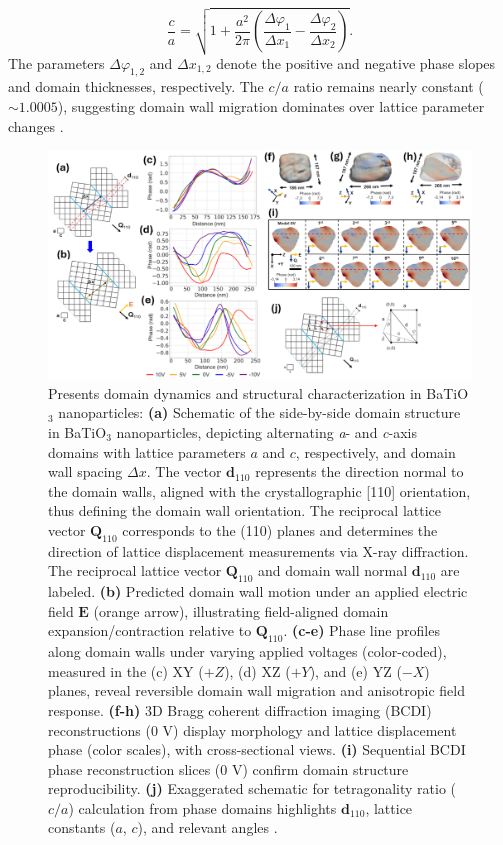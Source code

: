 \documentclass[a4paper,fleqn]{cas-sc}
\begin{document}
\begin{equation} 
\frac{c}{a} = \sqrt{1 + \frac{a^2}{2 \pi} \left( \frac{\Delta \varphi_1}{\Delta x_1} - \frac{\Delta \varphi_2}{\Delta x_2} \right)}.
\end{equation}
The parameters $\Delta\varphi_{1,2}$ and $\Delta x_{1,2}$ denote the positive and negative phase slopes and domain thicknesses, respectively. The $c/a$ ratio remains nearly constant ($\sim\!1.0005$), suggesting domain wall migration dominates over lattice parameter changes \cite{liu2025electric}.
\begin{figure}
\centering
\includegraphics[width=0.95\linewidth]{figures/BCDI_domain_dynamics_multiplane}
\caption{Presents domain dynamics and structural characterization in BaTiO\(_3\) nanoparticles: \textbf{(a)} Schematic of the side-by-side domain structure in BaTiO$_3$ nanoparticles, depicting alternating \textit{a}- and \textit{c}-axis domains with lattice parameters $a$ and $c$, respectively, and domain wall spacing $\Delta x$. The vector \(\mathbf{d}_{110}\) represents the direction normal to the domain walls, aligned with the crystallographic [110] orientation, thus defining the domain wall orientation. The reciprocal lattice vector \(\mathbf{Q}_{110}\) corresponds to the (110) planes and determines the direction of lattice displacement measurements via X-ray diffraction. The reciprocal lattice vector $\mathbf{Q}_{110}$ and domain wall normal $\mathbf{d}_{110}$ are labeled. \textbf{(b)} Predicted domain wall motion under an applied electric field $\mathbf{E}$ (orange arrow), illustrating field-aligned domain expansion/contraction relative to $\mathbf{Q}_{110}$. \textbf{(c-e)} Phase line profiles along domain walls under varying applied voltages (color-coded), measured in the (c) XY ($+Z$), (d) XZ ($+Y$), and (e) YZ ($-X$) planes, reveal reversible domain wall migration and anisotropic field response. \textbf{(f-h)} 3D Bragg coherent diffraction imaging (BCDI) reconstructions (0 V) display morphology and lattice displacement phase (color scales), with cross-sectional views. \textbf{(i)} Sequential BCDI phase reconstruction slices (0 V) confirm domain structure reproducibility. \textbf{(j)} Exaggerated schematic for tetragonality ratio ($c/a$) calculation from phase domains highlights $\mathbf{d}_{110}$, lattice constants ($a$, $c$), and relevant angles \cite{liu2025electric,bednyakov2025fragmented,zhang2025ferroelectric,valecha2025thermo}.}
    \label{fig:BCDI_domain_dynamics_multiplane}
\end{figure}
\end{document}
